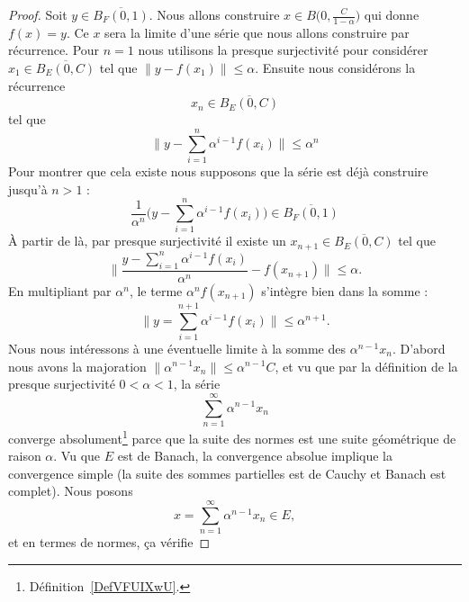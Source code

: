 	\begin{proof}
		Soit \( y\in \overline{ B_F(0,1) }\). Nous allons construire \( x\in B\big( 0,\frac{ C }{ 1-\alpha } \big)\) qui donne \( f(x)=y\). Ce \( x\) sera la limite d'une série que nous allons construire par récurrence. Pour \( n=1\) nous utilisons la presque surjectivité pour considérer \( x_1\in\overline{ B_E(0,C) } \) tel que \( \| y-f(x_1) \|\leq \alpha\). Ensuite nous considérons la récurrence
		\begin{equation}
			x_n\in \overline{ B_E(0,C) }
		\end{equation}
		tel que
		\begin{equation}
			\big\| y-\sum_{i=1}^n\alpha^{i-1}f(x_i) \big\|\leq \alpha^n
		\end{equation}
		Pour montrer que cela existe nous supposons que la série est déjà construire jusqu'à \( n>1\) :
		\begin{equation}
			\frac{1}{ \alpha^n }\Big( y-\sum_{i=1}^n\alpha^{i-1}f(x_i) \Big)\in \overline{ B_F(0,1) }
		\end{equation}
		À partir de là, par presque surjectivité il existe un \( x_{n+1}\in \overline{ B_E(0,C) }\) tel que
		\begin{equation}
			\big\| \frac{ y-\sum_{i=1}^n\alpha^{i-1}f(x_i) }{ \alpha^n }-f(x_{n+1}) \big\|\leq \alpha.
		\end{equation}
		En multipliant par \( \alpha^{n}\), le terme \( \alpha^nf(x_{n+1})\) s'intègre bien dans la somme :
		\begin{equation}
			\big\| y=\sum_{i=1}^{n+1}\alpha^{i-1}f(x_i) \big\|\leq \alpha^{n+1}.
		\end{equation}
		Nous nous intéressons à une éventuelle limite à la somme des \( \alpha^{n-1}x_n\). D'abord nous avons la majoration \( \| \alpha^{n-1}x_n \|\leq \alpha^{n-1}C\), et vu que par la définition de la presque surjectivité \( 0<\alpha<1\), la série
		\begin{equation}
			\sum_{n=1}^{\infty}\alpha^{n-1}x_n
		\end{equation}
		converge absolument\footnote{Définition~\ref{DefVFUIXwU}.} parce que la suite des normes est une suite géométrique de raison \( \alpha\). Vu que \( E\) est de Banach, la convergence absolue implique la convergence simple (la suite des sommes partielles est de Cauchy et Banach est complet). Nous posons
		\begin{equation}
			x=\sum_{n=1}^{\infty}\alpha^{n-1}x_n\in E,
		\end{equation}
		et en termes de normes, ça vérifie

\end{proof}
